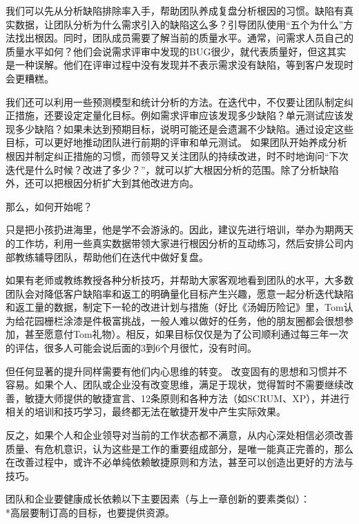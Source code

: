 {\begin{minipage}[t]{0.97\columnwidth}
我们可以先从分析缺陷排除率入手，帮助团队养成复盘分析根因的习惯。缺陷有真实数据，让团队分析为什么需求引入的缺陷这么多？引导团队使用“五个为什么”方法找出根因。同时，团队成员需要了解当前的质量水平。通常，问需求人员自己的质量水平如何？他们会说需求评审中发现的BUG很少，就代表质量好，但这其实是一种误解。他们在评审过程中没有发现并不表示需求没有缺陷，等到客户发现时会更糟糕。

我们还可以利用一些预测模型和统计分析的方法。在迭代中，不仅要让团队制定纠正措施，还要设定定量化目标。例如需求评审应该发现多少缺陷？单元测试应该发现多少缺陷？如果未达到预期目标，说明可能还是会遗漏不少缺陷。通过设定这些目标，可以更好地推动团队进行前期的评审和单元测试。 如果团队开始养成分析根因并制定纠正措施的习惯，而领导又关注团队的持续改进，时不时地询问“下次迭代是什么时候？改进了多少？”，就可以扩大根因分析的范围。除了分析缺陷外，还可以把根因分析扩大到其他改进方向。

那么，如何开始呢？

只是把小孩扔进海里，他是学不会游泳的。因此，建议先进行培训，举办为期两天的工作坊，利用一些真实数据带领大家进行根因分析的互动练习，然后安排公司内部教练辅导团队，帮助他们在迭代中做好复盘。


\strut
\end{minipage}} 


如果有老师或教练教授各种分析技巧，并帮助大家客观地看到团队的水平，大多数团队会对降低客户缺陷率和返工的明确量化目标产生兴趣，愿意一起分析迭代缺陷和返工量的数据，制定下一轮的改进计划与措施（好比《汤姆历险记》里，Tom认为给花园栅栏涂漆是件极富挑战，一般人难以做好的任务，他的朋友圈都会很想参加，甚至愿意付Tom礼物）。相反，如果目标仅仅是为了公司顺利通过每三年一次的评估，很多人可能会说后面的3到6个月很忙，没有时间。 


但任何显著的提升同样需要有他们内心思维的转变。 改变固有的思想和习惯并不容易。如果个人、团队或企业没有改变思维，满足于现状，觉得暂时不需要继续改善，敏捷大师提供的敏捷宣言、12条原则和各种方法（如SCRUM、XP），并进行相关的培训和技巧学习，最终都无法在敏捷开发中产生实际效果。 

反之，如果个人和企业领导对当前的工作状态都不满意，从内心深处相信必须改善质量、有危机意识，认为这些是工作的重要组成部分，是唯一能真正完善的，那么在改善过程中，或许不必单纯依赖敏捷原则和方法，甚至可以创造出更好的方法与技巧。 

团队和企业要健康成长依赖以下主要因素（与上一章创新的要素类似）：\\
*高层要制订高的目标，也要提供资源。

